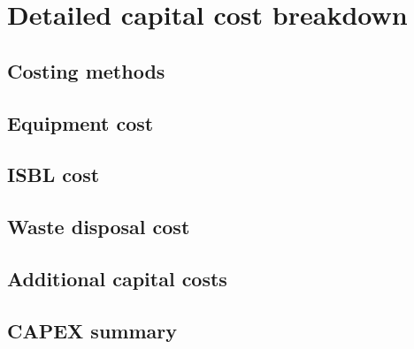 \section{Detailed capital cost breakdown}
\subsection{Costing methods}
\subsection{Equipment cost}
\subsection{ISBL cost}
\subsection{Waste disposal cost}
\subsection{Additional capital costs}
\subsection{CAPEX summary}